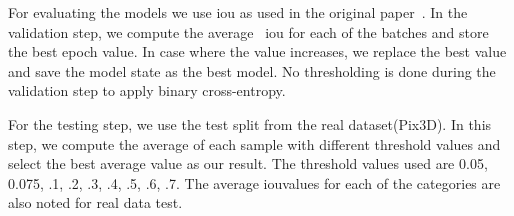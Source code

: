For evaluating the models we use \gls{iou} as used in the original paper~\cite{Xie_2019}.
In the validation step, we compute the average ~\gls{iou} for each of the batches and store the best epoch value.
In case where the value increases, we replace the best value and save the model state as the best model.
No thresholding is done during the validation step to apply binary cross-entropy.

For the testing step, we use the test split from the real dataset(Pix3D).
In this step, we compute the average of each sample with different threshold values and select the best average value as our result.
The threshold values used are 0.05, 0.075, .1, .2, .3, .4, .5, .6, .7.
The average \gls{iou}values for each of the categories are also noted for real data test.




